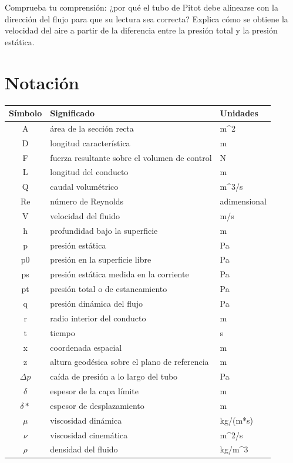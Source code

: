 \documentclass{book}
\begin{document}
\begin{tcolorbox}[title={Autoficha}, studiumcheck, breakable]

Comprueba tu comprensión: ¿por qué el tubo de Pitot debe alinearse con la dirección del flujo para que su lectura sea correcta? Explica cómo se obtiene la velocidad del aire a partir de la diferencia entre la presión total y la presión estática.
\end{tcolorbox}
\appendix
\chapter{Notación}

\begin{center}
\begin{tabular}{@{}cp{7cm}l@{}}
\textbf{Símbolo} & \textbf{Significado} & \textbf{Unidades} \\
\hline
A & área de la sección recta & m\textasciicircum{}2 \\
D & longitud característica & m \\
F & fuerza resultante sobre el volumen de control & N \\
L & longitud del conducto & m \\
Q & caudal volumétrico & m\textasciicircum{}3/s \\
Re & número de Reynolds & adimensional \\
V & velocidad del fluido & m/s \\
h & profundidad bajo la superficie & m \\
p & presión estática & Pa \\
p0 & presión en la superficie libre & Pa \\
ps & presión estática medida en la corriente & Pa \\
pt & presión total o de estancamiento & Pa \\
q & presión dinámica del flujo & Pa \\
r & radio interior del conducto & m \\
t & tiempo & s \\
x & coordenada espacial & m \\
z & altura geodésica sobre el plano de referencia & m \\
\(\Delta p\) & caída de presión a lo largo del tubo & Pa \\
\(\delta\) & espesor de la capa límite & m \\
\(\delta*\) & espesor de desplazamiento & m \\
\(\mu\) & viscosidad dinámica & kg/(m*s) \\
\(\nu\) & viscosidad cinemática & m\textasciicircum{}2/s \\
\(\rho\) & densidad del fluido & kg/m\textasciicircum{}3 \\
\end{tabular}
\end{center}
\end{document}
